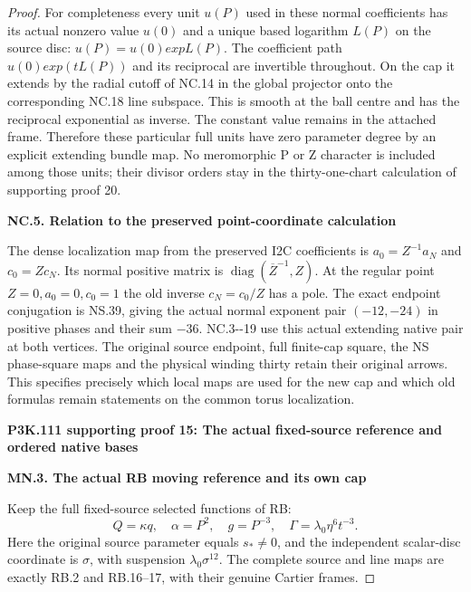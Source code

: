 \begin{proof}
For completeness every unit \(u(P)\) used in these normal coefficients
has its actual nonzero value \(u(0)\) and a unique based logarithm \(L(P)\)
on the source disc: \(u(P)=u(0)exp L(P)\). The coefficient path
\(u(0)exp(t L(P))\) and its reciprocal are invertible throughout. On
the cap it extends by the radial cutoff of NC.14 in the global
projector onto the corresponding NC.18 line subspace. This is smooth
at the ball centre and has the reciprocal exponential as inverse.
The constant value remains in the attached frame. Therefore these
particular full units have zero parameter degree by an explicit
extending bundle map. No meromorphic P or Z character is included
among those units; their divisor orders stay in the thirty-one-chart
calculation of supporting proof 20.

\par

\medskip\noindent\textbf{NC.5. Relation to the preserved point-coordinate calculation}

\par\nobreak

The dense localization map from the preserved I2C coefficients is
\(a_{0}=Z^{-1} a_N\) and \(c_{0}=Z c_N\). Its normal positive matrix is
\(\operatorname{diag}(\overline{Z}^{-1},Z)\). At the regular point \(Z=0,a_{0}=0,c_{0}=1\) the old inverse
\(c_N=c_{0}/Z\) has a pole. The exact endpoint conjugation is NS.39, giving
the actual normal exponent pair \((-12,-24)\) in positive phases and
their sum \(-36\). NC.3-\/-19 use this actual extending native pair at
both vertices. The original source endpoint, full finite-cap square,
the NS phase-square maps and the physical winding thirty retain
their original arrows. This specifies precisely which local maps are
used for the new cap and which old formulas remain statements on
the common torus localization.




\par\bigskip\noindent\textbf{P3K.111 supporting proof 15: The actual fixed-source reference and ordered native bases}\par\nobreak

\medskip\noindent\textbf{MN.3. The actual RB moving reference and its own cap}

\par\nobreak

Keep the full fixed-source selected functions of RB:
\[
 Q=\kappa q,\quad \alpha=P^2,\quad g=P^{-3},\quad
 \Gamma=\lambda_0\eta^6t^{-3}.
\]
Here the original source parameter equals \(s_*\ne0\), and the
independent scalar-disc coordinate is \(\sigma\), with suspension
\(\lambda_0\sigma^{12}\). The complete source and line maps
are exactly RB.2 and RB.16--17, with their genuine Cartier frames.


\end{proof}
